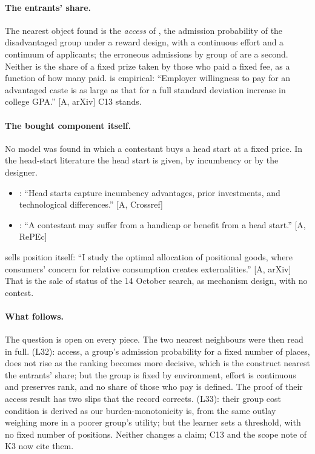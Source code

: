 \documentclass[11pt,a4paper]{article}
\newcommand{\aq}[2]{``#2''}
\begin{document}
\paragraph{The entrants' share.} The nearest object found is the
\emph{access} of \citet{LiuGargBorgs2022}, the admission probability of the
disadvantaged group under a reward design, with a continuous effort and a
continuum of applicants; the erroneous admissions by group of
\citet{HuImmorlicaVaughan2019} are a second. Neither is the share of a fixed
prize taken by those who paid a fixed fee, as a function of how many paid.
\citet{Shukla2022} is empirical: \aq{Shukla2022}{Employer willingness to pay for an advantaged caste is as large as that for a full standard deviation increase in college GPA.} [A, arXiv] C13 stands.

\paragraph{The bought component itself.} No model was found in which a
contestant buys a head start at a fixed price. In the head-start literature
the head start is given, by incumbency or by the designer.
\begin{itemize}
\item \citet{Siegel2014}: \aq{Siegel2014}{Head starts capture incumbency advantages, prior investments, and technological differences.} [A, Crossref]
\item \citet{Kirkegaard2012}: \aq{Kirkegaard2012}{A contestant may suffer from a handicap or benefit from a head start.} [A, RePEc]
\end{itemize}
\citet{Xiao2024} sells position itself: \aq{Xiao2024}{I study the optimal allocation of positional goods, where consumers' concern for relative consumption creates externalities.} [A, arXiv] That is the sale of status
of the 14 October search, as mechanism design, with no contest.

\paragraph{What follows.} The question is open on every piece. The two nearest
neighbours were then read in full. \citet{LiuGargBorgs2022} (L32): access, a
group's admission probability for a fixed number of places, does not rise as
the ranking becomes more decisive, which is the construct nearest the entrants'
share; but the group is fixed by environment, effort is continuous and
preserves rank, and no share of those who pay is defined. The proof of their
access result has two slips that the record corrects.
\citet{HuImmorlicaVaughan2019} (L33): their group cost condition is derived as
our burden-monotonicity is, from the same outlay weighing more in a poorer
group's utility; but the learner sets a threshold, with no fixed number of
positions. Neither changes a claim; C13 and the scope note of K3 now cite them.
\end{document}
